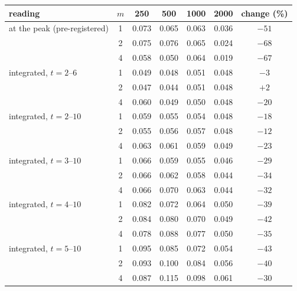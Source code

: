 \begin{tabular}{lcccccc}
reading & $m$ & 250 & 500 & 1000 & 2000 & change (\%) \\
\hline
at the peak (pre-registered) & 1 & 0.073 & 0.065 & 0.063 & 0.036 & $-51$ \\
 & 2 & 0.075 & 0.076 & 0.065 & 0.024 & $-68$ \\
 & 4 & 0.058 & 0.050 & 0.064 & 0.019 & $-67$ \\
integrated, $t=2$--$6$ & 1 & 0.049 & 0.048 & 0.051 & 0.048 & $-3$ \\
 & 2 & 0.047 & 0.044 & 0.051 & 0.048 & $+2$ \\
 & 4 & 0.060 & 0.049 & 0.050 & 0.048 & $-20$ \\
integrated, $t=2$--$10$ & 1 & 0.059 & 0.055 & 0.054 & 0.048 & $-18$ \\
 & 2 & 0.055 & 0.056 & 0.057 & 0.048 & $-12$ \\
 & 4 & 0.063 & 0.061 & 0.059 & 0.049 & $-23$ \\
integrated, $t=3$--$10$ & 1 & 0.066 & 0.059 & 0.055 & 0.046 & $-29$ \\
 & 2 & 0.066 & 0.062 & 0.058 & 0.044 & $-34$ \\
 & 4 & 0.066 & 0.070 & 0.063 & 0.044 & $-32$ \\
integrated, $t=4$--$10$ & 1 & 0.082 & 0.072 & 0.064 & 0.050 & $-39$ \\
 & 2 & 0.084 & 0.080 & 0.070 & 0.049 & $-42$ \\
 & 4 & 0.078 & 0.088 & 0.077 & 0.050 & $-35$ \\
integrated, $t=5$--$10$ & 1 & 0.095 & 0.085 & 0.072 & 0.054 & $-43$ \\
 & 2 & 0.093 & 0.100 & 0.084 & 0.056 & $-40$ \\
 & 4 & 0.087 & 0.115 & 0.098 & 0.061 & $-30$ \\
\end{tabular}
